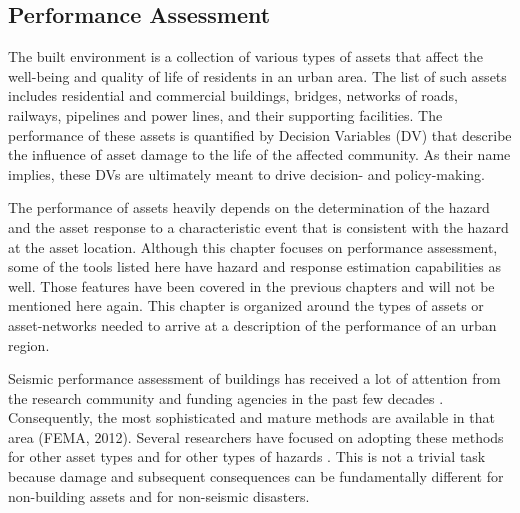 
\begin{partbacktext}
\part{Performance Assessment}\label{part:Performance}

The built environment is a collection of various types of assets that affect the well-being and quality of life of residents in an urban area. The list of such assets includes residential and commercial buildings, bridges, networks of roads, railways, pipelines and power lines, and their supporting facilities. The performance of these assets is quantified by Decision Variables (DV) that describe the influence of asset damage to the life of the affected community. As their name implies, these DVs are ultimately meant to drive decision- and policy-making.

The performance of assets heavily depends on the determination of the hazard and the asset response to a characteristic event that is consistent with the hazard at the asset location. Although this chapter focuses on performance assessment, some of the tools listed here have hazard and response estimation capabilities as well. Those features have been covered in the previous chapters and will not be mentioned here again. This chapter is organized around the types of assets or asset-networks needed to arrive at a description of the performance of an urban region. 

Seismic performance assessment of buildings has received a lot of attention from the research community and funding agencies in the past few decades \citep{ATC 1985; FEMA Mitigation Division 2018b; 2018c, fajfar2004performancebased, FEMA  2012}. Consequently, the most sophisticated and mature methods are available in that area (FEMA, 2012). Several researchers have focused on adopting these methods for other asset types \citep{werner2006redars, chmielewski2016response} and for other types of hazards \citep{FEMA Mitigation Division, 2018c, attary2017performancebased, barbato2013performancebased, lange2014application}. This is not a trivial task because damage and subsequent consequences can be fundamentally different for non-building assets and for non-seismic disasters.  

\end{partbacktext}
